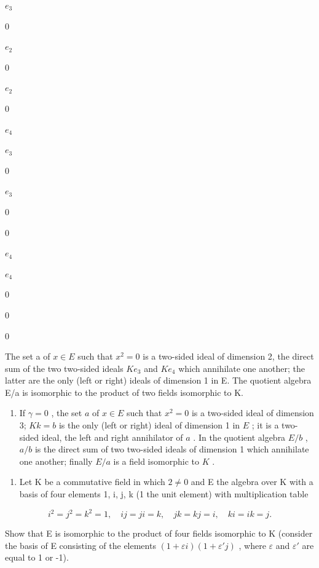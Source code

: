 \(e_3\)

0

\(e_2\)

0

\(e_2\)

0

\(e_4\)

\(e_3\)

0

\(e_3\)

0

0

\(e_4\)

\(e_4\)

0

0

0

The set a of \(x \in E\) such that \(x^{2} = 0\) is a two-sided ideal of dimension 2, the direct sum of the two two-sided ideals \(Ke_{3}\) and \(Ke_{4}\) which annihilate one another; the latter are the only (left or right) ideals of dimension 1 in E. The quotient algebra E/a is isomorphic to the product of two fields isomorphic to K.

\begin{enumerate}
\def\labelenumi{(\alph{enumi})}
\setcounter{enumi}{2}
\tightlist
\item
  If \(\gamma = 0\) , the set \(a\) of \(x \in E\) such that \(x^2 = 0\) is a two-sided ideal of dimension 3; \(Kk = b\) is the only (left or right) ideal of dimension 1 in \(E\) ; it is a two-sided ideal, the left and right annihilator of \(a\) . In the quotient algebra \(E/b\) , \(a/b\) is the direct sum of two two-sided ideals of dimension 1 which annihilate one another; finally \(E/a\) is a field isomorphic to \(K\) .
\end{enumerate}

\begin{enumerate}
\def\labelenumi{\arabic{enumi}.}
\setcounter{enumi}{6}
\tightlist
\item
  Let K be a commutative field in which \(2 \neq 0\) and E the algebra over K with a basis of four elements 1, i, j, k (1 the unit element) with multiplication table
\end{enumerate}

\[
i ^ {2} = j ^ {2} = k ^ {2} = 1, \quad i j = j i = k, \quad j k = k j = i, \quad k i = i k = j.
\]

Show that E is isomorphic to the product of four fields isomorphic to K (consider the basis of E consisting of the elements \((1 + \varepsilon i)(1 + \varepsilon'j)\) , where \(\varepsilon\) and \(\varepsilon'\) are equal to 1 or -1).

